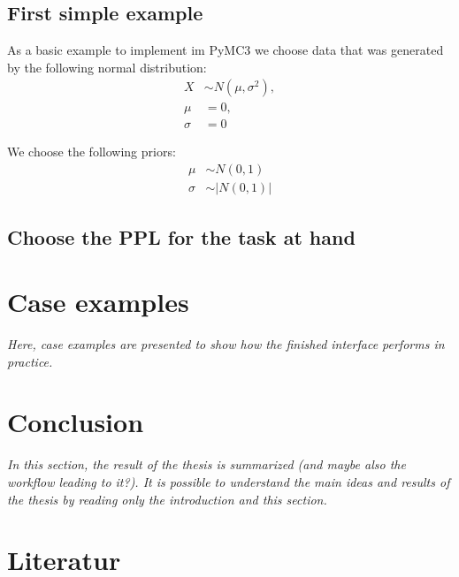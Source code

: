 \documentclass{article}
\begin{document}
\subsection{First simple example}
As a basic example to implement im PyMC3 we choose data that was generated by the following normal distribution:
\begin{equation}
\begin{split}
	X &\sim N(\mu,\sigma^2), \\
	\mu &= 0, \\
	\sigma &= 0
\end{split}
\end{equation}

We choose the following priors:
\begin{equation}
\begin{split}
\mu &\sim N(0,1) \\
\sigma &\sim |N(0,1)|
\end{split}
\end{equation}

\subsection{Choose the PPL for the task at hand}

\section{Case examples}

\textit{Here, case examples are presented to show how the finished interface performs in practice.}

\section {Conclusion}

\textit{In this section, the result of the thesis is summarized (and maybe also the workflow leading to it?). It is possible to understand the main ideas and results of the thesis by reading only the introduction and this section.}

\listoffigures
        
\section{Literatur}



\end{document}
